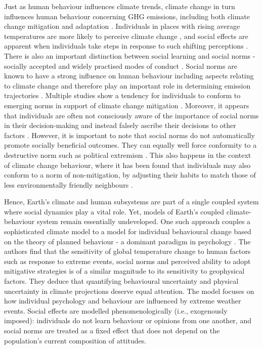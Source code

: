 \documentclass[10pt,letterpaper]{article}
\begin{document}
Just as human behaviour influences climate trends, climate change in turn influences human behaviour concerning GHG emissions, including both climate change mitigation and adaptation \cite{castree14,clayton15,baird14,weber10,howe13}. Individuals in places with rising average temperatures are more likely to perceive climate change \cite{howe13}, and social effects are apparent when individuals take steps in response to such shifting perceptions \cite{clayton15,baird14}. There is also an important distinction between social learning and social norms - socially accepted and widely practised modes of conduct \cite{allcott11}. Social norms are known to have a strong influence on human behaviour \cite{cialdini91} including aspects relating to climate change \cite{bollinger12,allcott11,nolan08} and therefore play an important role in determining emission trajectories \cite{clayton15}. Multiple studies show a tendency for individuals to conform to emerging norms in support of climate change mitigation \cite{bollinger12,allcott11}. Moreover, it appears that individuals are often not consciously aware of the importance of social norms in their decision-making and instead falsely ascribe their decisions to other factors \cite{nolan08}. However, it is important to note that social norms do not automatically promote socially beneficial outcomes. They can equally well force conformity to a destructive norm such as political extremism \cite{smith14}. This also happens in the context of climate change behaviour, where it has been found that individuals may also conform to a norm of non-mitigation, by adjusting their habits to match those of less environmentally friendly neighbours \cite{nolan08,stoll01}.

Hence, Earth's climate and human subsystems are part of a single coupled system where social dynamics play a vital role. Yet, models of Earth's coupled climate-behaviour system remain essentially undeveloped. One such approach \cite{beckage18} couples a sophisticated climate model \cite{sterman12} to a model for individual behavioural change based on the theory of planned behaviour - a dominant paradigm in psychology \cite{ajzen91}. The authors find that the sensitivity of global temperature change to human factors such as response to extreme events, social norms and perceived ability to adopt mitigative strategies is of a similar magnitude to its sensitivity to geophysical factors. They deduce that quantifying behavioural uncertainty and physical uncertainty in climate projections deserve equal attention. The model focuses on how individual psychology and behaviour are influenced by extreme weather events. Social effects are modelled phenomenologically (i.e., exogenously imposed): individuals do not learn behaviour or opinions from one another, and social norms are treated as a fixed effect that does not depend on the population's current composition of attitudes.
\end{document}
